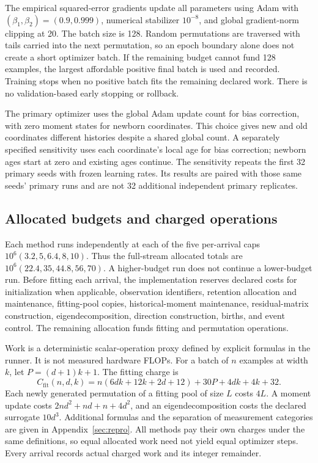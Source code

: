 \documentclass[10pt]{article}
\begin{document}
The empirical squared-error gradients update all parameters using
Adam with $(\beta_1,\beta_2)=(0.9,0.999)$, numerical stabilizer
$10^{-8}$, and global gradient-norm clipping at 20. The batch size is
128. Random permutations are traversed with tails carried into the
next permutation, so an epoch boundary alone does not create a short
optimizer batch. If the remaining budget cannot fund 128 examples,
the largest affordable positive final batch is used and recorded.
Training stops when no positive batch fits the remaining declared
work. There is no validation-based early stopping or rollback.

The primary optimizer uses the global Adam update count for bias
correction, with zero moment states for newborn coordinates. This
choice gives new and old coordinates different histories despite a
shared global count. A separately specified sensitivity uses each
coordinate's local age for bias correction; newborn ages start at
zero and existing ages continue. The sensitivity repeats the first
32 primary seeds with frozen learning rates. Its results are paired
with those same seeds' primary runs and are not 32 additional
independent primary replicates.

\subsection{Allocated budgets and charged operations}
\label{sec:accounting}

Each method runs independently at each of the five per-arrival caps
$10^6(3.2,5,6.4,8,10)$. Thus the full-stream allocated totals are
$10^6(22.4,35,44.8,56,70)$. A higher-budget run does not continue a
lower-budget run. Before fitting each arrival, the implementation
reserves declared costs for initialization when applicable,
observation identifiers, retention allocation and maintenance,
fitting-pool copies, historical-moment maintenance, residual-matrix
construction, eigendecomposition, direction construction, births,
and event control. The remaining allocation funds fitting and
permutation operations.

Work is a deterministic scalar-operation proxy defined by explicit
formulas in the runner. It is not measured hardware FLOPs.
For a batch of $n$ examples at width $k$, let $P=(d+1)k+1$.
The fitting charge is
\begin{equation}
 C_{\mathrm{fit}}(n,d,k)
 =n(6dk+12k+2d+12)+30P+4dk+4k+32.
 \label{eq:work-fit}
\end{equation}
Each newly generated permutation of a fitting pool of size $L$
costs $4L$. A moment update costs
$2nd^2+nd+n+4d^2$, and an eigendecomposition costs the declared
surrogate $10d^3$. Additional formulas and the separation of
measurement categories are given in Appendix~\ref{sec:repro}.
All methods pay their own charges under the same definitions, so
equal allocated work need not yield equal optimizer steps. Every
arrival records actual charged work and its integer remainder.
\end{document}
